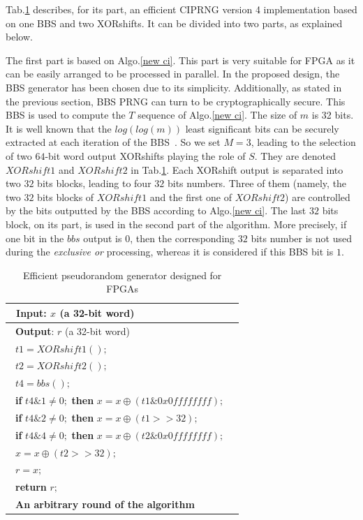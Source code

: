 \label{prng fpga}
Tab.\ref{fpga ci} describes, for its part,
an efficient CIPRNG version 4 implementation based on one BBS and two XORshifts.
It can be divided into two parts, as explained below. 

The first part is based on Algo.\ref{new ci}.
This part is very suitable for FPGA as it can be easily 
arranged to be processed in parallel.
In the proposed design, the BBS  generator has been chosen 
due to its simplicity. Additionally, as stated in the previous section, 
BBS PRNG can turn to be cryptographically secure.
This BBS is used to compute the $T$ sequence of Algo.\ref{new ci}.
The size of $m$ is 32 bits. 
It is well known that the $log(log(m))$ least significant bits 
can be securely extracted at each iteration of the BBS~\cite{vmd}.
So we set $M = 3$, leading to the selection of two $64$-bit word output XORshifts 
playing the role of $S$. They are denoted $XORshift1$ and $XORshift2$ 
in Tab.\ref{fpga ci}. 
Each XORshift output is separated into two $32$ bits blocks, leading to 
four $32$ bits numbers. 
Three of them (namely, the two $32$ bits blocks of $XORshift1$ 
and the first one of $XORshift2$) are controlled by the bits outputted
by the BBS according to Algo.\ref{new ci}.
The last $32$ bits block, on its part, is used in the second part of the algorithm.
More precisely, if one bit in the $bbs$ output is $0$, then the corresponding 
$32$ bits number is not used during the \emph{exclusive or} processing, 
whereas it is considered if this BBS bit is $1$.

\begin{table}
\caption{Efficient pseudorandom generator designed for FPGAs}
\centering
\begin{tabular}{|l|l|}
\hline
~\textbf{Input}: $x$ (a 32-bit word)\\
\hline
~\textbf{Output}: $r$ (a 32-bit word)\\
\hline
~$t1 = XORshift1();$\\
~$t2 = XORshift2();$\\
~$t4 = bbs();$\\
~\textbf{if} $t4 \& 1 \neq 0;$ \textbf{then} $x = x \oplus (t1 \& 0x0ffffffff);$\\
~\textbf{if} $t4 \& 2 \neq 0;$ \textbf{then} $x = x \oplus (t1 >> 32);$\\
~\textbf{if} $t4 \& 4 \neq 0;$ \textbf{then} $x = x \oplus (t2 \& 0x0ffffffff);$\\
~$x = x \oplus (t2 >> 32);$\\
~$r = x;$\\
~\textbf{return} $r;$\\
\hline
~\textbf{An arbitrary round of the algorithm}~\\
\hline
\end{tabular}
\label{fpga ci}
\end{table}

